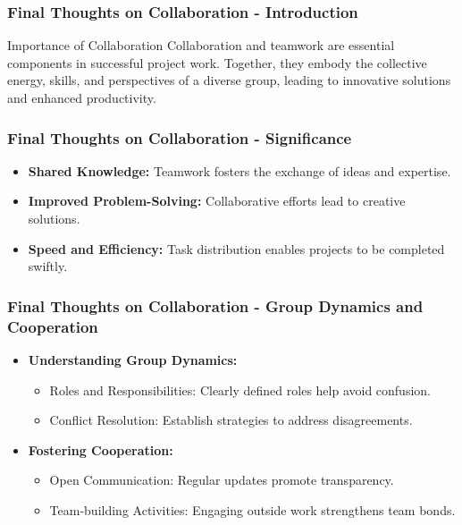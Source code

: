 \documentclass[aspectratio=169]{beamer}
\begin{document}
\begin{frame}[fragile]
    \frametitle{Final Thoughts on Collaboration - Introduction}
    \begin{block}{Importance of Collaboration}
        Collaboration and teamwork are essential components in successful project work. Together, they embody the collective energy, skills, and perspectives of a diverse group, leading to innovative solutions and enhanced productivity.
    \end{block}
\end{frame}

\begin{frame}[fragile]
    \frametitle{Final Thoughts on Collaboration - Significance}
    \begin{itemize}
        \item \textbf{Shared Knowledge:} Teamwork fosters the exchange of ideas and expertise.
        \item \textbf{Improved Problem-Solving:} Collaborative efforts lead to creative solutions.
        \item \textbf{Speed and Efficiency:} Task distribution enables projects to be completed swiftly.
    \end{itemize}
\end{frame}

\begin{frame}[fragile]
    \frametitle{Final Thoughts on Collaboration - Group Dynamics and Cooperation}
    \begin{itemize}
        \item \textbf{Understanding Group Dynamics:}
            \begin{itemize}
                \item Roles and Responsibilities: Clearly defined roles help avoid confusion.
                \item Conflict Resolution: Establish strategies to address disagreements.
            \end{itemize}
        
        \item \textbf{Fostering Cooperation:} 
            \begin{itemize}
                \item Open Communication: Regular updates promote transparency.
                \item Team-building Activities: Engaging outside work strengthens team bonds.
            \end{itemize}
    \end{itemize}
\end{frame}
\end{document}
